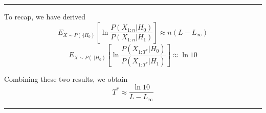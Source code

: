 \begin{center}\rule{0.5\linewidth}{0.5pt}\end{center}

To recap, we have derived
$$E_{X \sim P(\cdot | H_0)}\left[ \ln\frac{P(X_{1:n}|H_0)}{P(X_{1:n}|H_1)}\right] \approx n(L-L_\infty )$$
$$
E_{X \sim P(\cdot | H_0)}\left[ \ln\frac{P(X_{1:T^*}|H_0)}{P(X_{1:T^*}|H_1)}\right] \approx \ln 10
$$

Combining these two results, we obtain
$$T^* \approx \frac{\ln 10}{L - L_\infty}$$


\begin{center}\rule{0.5\linewidth}{0.5pt}\end{center}


